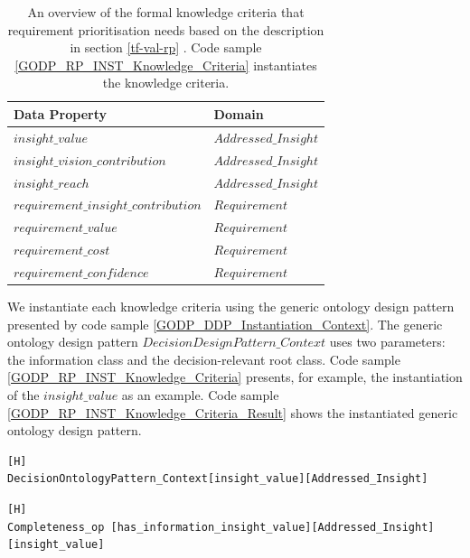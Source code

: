 \begin{table}[H]
\centering
\caption{An overview of the formal knowledge criteria that requirement prioritisation needs based on the description in section \ref{tf-val-rp} . Code sample \ref{GODP_RP_INST_Knowledge_Criteria} instantiates the knowledge criteria.}
\begin{tabular}{| p{9cm} | p{4cm} | }
\hline
\rowcolor{document}
\color{documentText}Data Property & \color{documentText}Domain  \\
\hline
$insight\_value$ & $Addressed\_Insight$  \\
\hdashline
$insight\_vision\_contribution$ & $Addressed\_Insight$   \\
\hdashline
$insight\_reach$ & $Addressed\_Insight$  \\
\hdashline
$requirement\_insight\_contribution$ & $Requirement$   \\
\hdashline
$requirement\_value$ & $Requirement$   \\ 
\hdashline
$requirement\_cost$ & $Requirement$   \\ 
\hdashline
$requirement\_confidence$ & $Requirement$  \\ 
\hline
\end{tabular}
\label{table:rp_formal_dataproperties}
\end{table}

We instantiate each knowledge criteria using the generic ontology design pattern presented by code sample \ref{GODP_DDP_Instantiation_Context}. The generic ontology design pattern $DecisionDesignPattern\_Context$ uses two parameters: the information class and the decision-relevant root class. Code sample \ref{GODP_RP_INST_Knowledge_Criteria} presents, for example, the instantiation of the $insight\_value$ as an example. Code sample \ref{GODP_RP_INST_Knowledge_Criteria_Result} shows the instantiated generic ontology design pattern.

\begin{lstlisting}[float,language=GDOL,caption={The GDOL instantiation code of the knowledge criteria.},label={GODP_RP_INST_Knowledge_Criteria}][H]
DecisionOntologyPattern_Context[insight_value][Addressed_Insight]
\end{lstlisting}

\begin{lstlisting}[float,language=GDOL,caption={The result of the GDOL instantiation code that code sample \ref{GODP_RP_INST_Knowledge_Criteria} presents.},label={GODP_RP_INST_Knowledge_Criteria_Result}][H]
Completeness_op [has_information_insight_value][Addressed_Insight][insight_value] 
\end{lstlisting}

